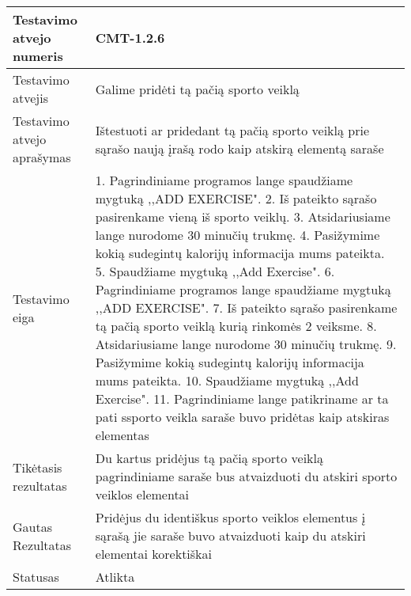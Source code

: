\documentclass[oneside]{VUMIFPSkursinis}
\begin{document}
\begin{center}
    \begin{tabular}{ |p{5cm}|p{13cm}|}
    \hline
        Testavimo atvejo numeris &  CMT-1.2.6\\ \hline
        Testavimo atvejis & Galime pridėti tą pačią sporto veiklą  \\ \hline
        Testavimo atvejo aprašymas & Ištestuoti ar pridedant tą pačią sporto veiklą prie sąrašo naują įrašą rodo kaip atskirą elementą saraše  \\ \hline
        Testavimo eiga &  1. Pagrindiniame programos lange spaudžiame mygtuką ,,ADD EXERCISE". 
				2. Iš pateikto sąrašo pasirenkame vieną iš sporto veiklų. 
				3. Atsidariusiame lange nurodome 30 minučių trukmę.
				4. Pasižymime kokią sudegintų kalorijų informacija mums pateikta. 
				5. Spaudžiame mygtuką ,,Add Exercise".
				6. Pagrindiniame programos lange spaudžiame mygtuką ,,ADD EXERCISE".
				7. Iš pateikto sąrašo pasirenkame tą pačią sporto veiklą kurią rinkomės 2 veiksme.
				8. Atsidariusiame lange nurodome 30 minučių trukmę.
				9. Pasižymime kokią sudegintų kalorijų informacija mums pateikta.
				10. Spaudžiame mygtuką ,,Add Exercise".
				11. Pagrindiniame lange patikriname ar ta pati ssporto veikla saraše buvo pridėtas kaip atskiras elementas 
			\\ \hline
        Tikėtasis rezultatas &  Du kartus pridėjus tą pačią sporto veiklą pagrindiniame saraše bus atvaizduoti du atskiri sporto veiklos elementai\\ \hline
        Gautas Rezultatas &  Pridėjus du identiškus sporto veiklos elementus į sąrašą jie saraše buvo atvaizduoti kaip du atskiri elementai korektiškai\\ \hline
        Statusas & Atlikta \\ \hline
    \hline
    \end{tabular}
\end{center}
\end{document}
